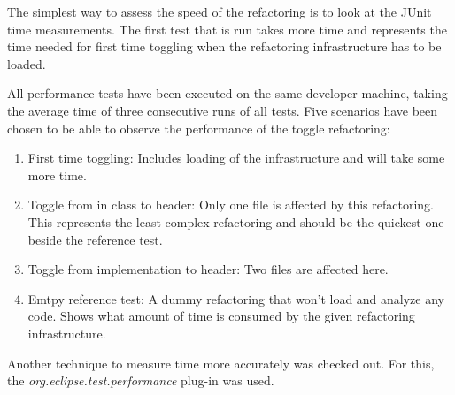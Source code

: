 The simplest way to assess the speed of the refactoring is to look at the JUnit
time measurements. The first test that is run takes more time and represents the 
time needed for first time toggling when the refactoring infrastructure has to 
be loaded. 

All performance tests have been executed on the same developer machine, taking
the average time of three consecutive runs of all tests. Five scenarios have
been chosen to be able to observe the performance of the toggle refactoring:

\begin{enumerate}
\item First time toggling: Includes loading of the infrastructure and will take 
some more time.
\item Toggle from in class to header: Only one file is affected by this 
refactoring. This represents the least complex refactoring and should be the 
quickest one beside the reference test.
\item Toggle from implementation to header: Two files are affected here.
\item Emtpy reference test: A dummy refactoring that won't load and analyze any 
code. Shows what amount of time is consumed by the given refactoring 
infrastructure.
\end{enumerate}

Another technique to measure time more accurately was checked out. For this, the 
\textit{org.eclipse.test.performance} plug-in was used.
